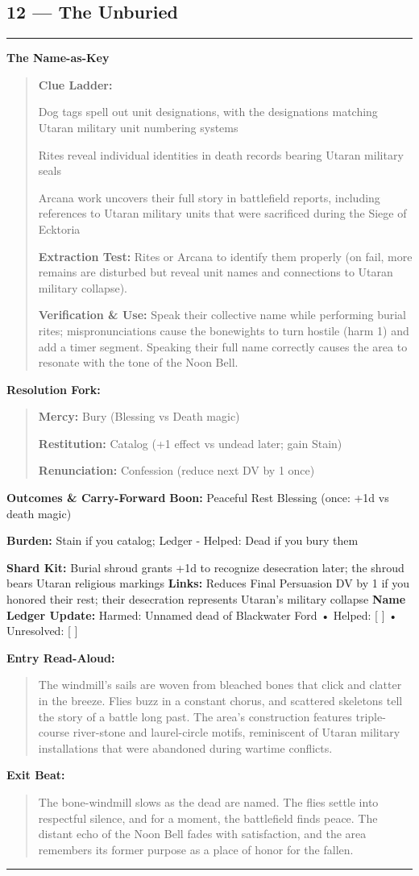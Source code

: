 \documentclass[18pt, letterpaper, twoside]{article}
\newenvironment{floorbox}[1]{%
    \begin{center}
    \begin{minipage}{0.95\textwidth}
    \subsection*{#1}
    \vspace{-0.5em}
    \rule{\textwidth}{0.5pt}
    \vspace{0.5em}
}{%
    \vspace{0.5em}
    \rule{\textwidth}{0.5pt}
    \end{minipage}
    \end{center}
}
\newenvironment{gmnote}[1]{%
    \vspace{0.5em}
    \noindent\textbf{#1}
    \begin{quote}
}{%
    \end{quote}
    \vspace{0.5em}
}
\newenvironment{resolutionbox}{%
    \vspace{0.5em}
    \noindent\textbf{Resolution Fork:}
    \begin{quote}
}{%
    \end{quote}
    \vspace{0.5em}
}
\newenvironment{boxedtext}[1]{%
    \vspace{0.5em}
    \noindent\textbf{#1}
    \begin{quote}
}{%
    \end{quote}
    \vspace{0.5em}
}
\newcommand{\boon}[1]{\noindent\textbf{Boon:} #1\par}
\newcommand{\burden}[1]{\noindent\textbf{Burden:} #1\par}
\newcommand{\entrytext}[1]{\begin{boxedtext}{Entry Read-Aloud:} #1 \end{boxedtext}}
\newcommand{\exittext}[1]{\begin{boxedtext}{Exit Beat:} #1 \end{boxedtext}}
\begin{document}
\begin{floorbox}{12 --- The Unburied}
\begin{gmnote}{The Name-as-Key}
\textbf{Clue Ladder:}
\begin{description}[leftmargin=*, style=unboxed]
    \item[Gentle Nudge:] Dog tags spell out unit designations, with the designations matching Utaran military unit numbering systems
    \item[Actionable Lead:] Rites reveal individual identities in death records bearing Utaran military seals
    \item[Aha! Proof:] Arcana work uncovers their full story in battlefield reports, including references to Utaran military units that were sacrificed during the Siege of Ecktoria
\end{description}

\textbf{Extraction Test:} Rites or Arcana to identify them properly (on fail, more remains are disturbed but reveal unit names and connections to Utaran military collapse).

\textbf{Verification \& Use:} Speak their collective name while performing burial rites; mispronunciations cause the bonewights to turn hostile (harm 1) and add a timer segment. Speaking their full name correctly causes the area to resonate with the tone of the Noon Bell.
\end{gmnote}

\begin{resolutionbox}
\textbf{Mercy:} Bury (Blessing vs Death magic)

\textbf{Restitution:} Catalog (+1 effect vs undead later; gain Stain)

\textbf{Renunciation:} Confession (reduce next DV by 1 once)
\end{resolutionbox}

\textbf{Outcomes \& Carry-Forward}
\boon{Peaceful Rest Blessing (once: +1d vs death magic)}
\burden{Stain if you catalog; Ledger - Helped: Dead if you bury them}
\textbf{Shard Kit:} Burial shroud grants +1d to recognize desecration later; the shroud bears Utaran religious markings
\textbf{Links:} Reduces Final Persuasion DV by 1 if you honored their rest; their desecration represents Utaran's military collapse
\textbf{Name Ledger Update:} Harmed: Unnamed dead of Blackwater Ford • Helped: [ ] • Unresolved: [ ]

\entrytext{The windmill's sails are woven from bleached bones that click and clatter in the breeze. Flies buzz in a constant chorus, and scattered skeletons tell the story of a battle long past. The area's construction features triple-course river-stone and laurel-circle motifs, reminiscent of Utaran military installations that were abandoned during wartime conflicts.}

\exittext{The bone-windmill slows as the dead are named. The flies settle into respectful silence, and for a moment, the battlefield finds peace. The distant echo of the Noon Bell fades with satisfaction, and the area remembers its former purpose as a place of honor for the fallen.}
\end{floorbox}
\end{document}
